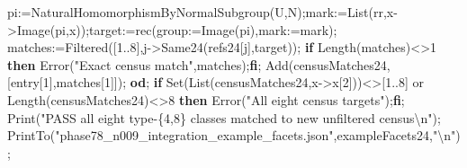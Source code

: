 \documentclass[
  10pt,
  letterpaper,
]{article}
\newenvironment{Shaded}{}{}
\newcommand{\BuiltInTok}[1]{\textcolor[rgb]{0.00,0.50,0.00}{#1}}
\newcommand{\ConstantTok}[1]{\textcolor[rgb]{0.53,0.00,0.00}{#1}}
\newcommand{\ControlFlowTok}[1]{\textcolor[rgb]{0.00,0.44,0.13}{\textbf{#1}}}
\newcommand{\ExtensionTok}[1]{#1}
\newcommand{\FloatTok}[1]{\textcolor[rgb]{0.25,0.63,0.44}{#1}}
\newcommand{\NormalTok}[1]{#1}
\newcommand{\OperatorTok}[1]{\textcolor[rgb]{0.40,0.40,0.40}{#1}}
\newcommand{\StringTok}[1]{\textcolor[rgb]{0.25,0.44,0.63}{#1}}
\newcommand{\VariableTok}[1]{\textcolor[rgb]{0.10,0.09,0.49}{#1}}
\begin{document}
\begin{Shaded}
\begin{Highlighting}[]
 \VariableTok{pi}\OperatorTok{:=}\BuiltInTok{NaturalHomomorphismByNormalSubgroup}\NormalTok{(}\VariableTok{U}\OperatorTok{,}\VariableTok{N}\NormalTok{)}\OperatorTok{;}\VariableTok{mark}\OperatorTok{:=}\BuiltInTok{List}\NormalTok{(}\VariableTok{rr}\OperatorTok{,}\VariableTok{x}\OperatorTok{{-}\textgreater{}}\BuiltInTok{Image}\NormalTok{(}\VariableTok{pi}\OperatorTok{,}\VariableTok{x}\NormalTok{))}\OperatorTok{;}\VariableTok{target}\OperatorTok{:=}\ExtensionTok{rec}\NormalTok{(}\VariableTok{group}\OperatorTok{:=}\BuiltInTok{Image}\NormalTok{(}\VariableTok{pi}\NormalTok{)}\OperatorTok{,}\VariableTok{mark}\OperatorTok{:=}\VariableTok{mark}\NormalTok{)}\OperatorTok{;}
 \VariableTok{matches}\OperatorTok{:=}\BuiltInTok{Filtered}\NormalTok{([}\FloatTok{1}\OperatorTok{..}\FloatTok{8}\NormalTok{]}\OperatorTok{,}\VariableTok{j}\OperatorTok{{-}\textgreater{}}\VariableTok{Same24}\NormalTok{(}\VariableTok{refs24}\NormalTok{[}\VariableTok{j}\NormalTok{]}\OperatorTok{,}\VariableTok{target}\NormalTok{))}\OperatorTok{;}
 \ControlFlowTok{if} \BuiltInTok{Length}\NormalTok{(}\VariableTok{matches}\NormalTok{)}\OperatorTok{\textless{}\textgreater{}}\FloatTok{1} \ControlFlowTok{then} \BuiltInTok{Error}\NormalTok{(}\StringTok{"Exact census match"}\OperatorTok{,}\VariableTok{matches}\NormalTok{)}\OperatorTok{;}\ControlFlowTok{fi}\OperatorTok{;}
 \BuiltInTok{Add}\NormalTok{(}\VariableTok{censusMatches24}\OperatorTok{,}\NormalTok{[}\VariableTok{entry}\NormalTok{[}\FloatTok{1}\NormalTok{]}\OperatorTok{,}\VariableTok{matches}\NormalTok{[}\FloatTok{1}\NormalTok{]])}\OperatorTok{;}
\ControlFlowTok{od}\OperatorTok{;}
\ControlFlowTok{if} \BuiltInTok{Set}\NormalTok{(}\BuiltInTok{List}\NormalTok{(}\VariableTok{censusMatches24}\OperatorTok{,}\VariableTok{x}\OperatorTok{{-}\textgreater{}}\VariableTok{x}\NormalTok{[}\FloatTok{2}\NormalTok{]))}\OperatorTok{\textless{}\textgreater{}}\NormalTok{[}\FloatTok{1}\OperatorTok{..}\FloatTok{8}\NormalTok{] }\ConstantTok{or} \BuiltInTok{Length}\NormalTok{(}\VariableTok{censusMatches24}\NormalTok{)}\OperatorTok{\textless{}\textgreater{}}\FloatTok{8} \ControlFlowTok{then} \BuiltInTok{Error}\NormalTok{(}\StringTok{"All eight census targets"}\NormalTok{)}\OperatorTok{;}\ControlFlowTok{fi}\OperatorTok{;}
\BuiltInTok{Print}\NormalTok{(}\StringTok{"PASS all eight type{-}\{4,8\} classes matched to new unfiltered census\textbackslash{}n"}\NormalTok{)}\OperatorTok{;}
\BuiltInTok{PrintTo}\NormalTok{(}\StringTok{"phase78\_n009\_integration\_example\_facets.json"}\OperatorTok{,}\VariableTok{exampleFacets24}\OperatorTok{,}\StringTok{"\textbackslash{}n"}\NormalTok{)}\OperatorTok{;}

\end{Highlighting}
\end{Shaded}
\end{document}
